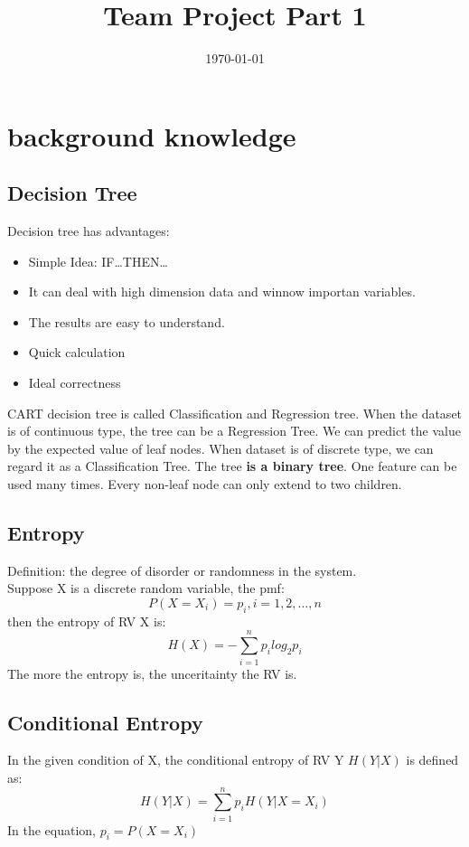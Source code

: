 \documentclass[50pt]{article}
\title{Team Project Part 1}
\date{\today}
\begin{document}
\maketitle

\clearpage
\tableofcontents
\section{background knowledge}
\subsection{Decision Tree}
Decision tree has advantages:
\begin{itemize}
    \item Simple Idea: IF\dots THEN\dots
    \item It can deal with high dimension data and winnow importan variables.
    \item The results are easy to understand.
    \item Quick calculation
    \item Ideal correctness
\end{itemize}
CART decision tree is called Classification and Regression tree. When the dataset is of 
continuous type, the tree can be a Regression Tree. We can predict the value
by the expected value of leaf nodes. When dataset is of discrete type, we can regard it
as a Classification Tree. The tree \textbf{is a binary tree}. One feature can
be used many times. Every non-leaf node can only extend to two children.

\subsection{Entropy}
    Definition: the degree of disorder or randomness in the system.\\
    Suppose X is a discrete random variable, the pmf:
    $$P(X = X_i) = p_i, i = 1, 2, \dots, n$$
    then the entropy of RV X is:
    $$H(X) = -\sum_{i=1}^{n}p_{i}log_{2}{p_i}$$
    The more the entropy is, the unceritainty the RV is.
\subsection{Conditional Entropy}
    In the given condition of X, the conditional entropy of RV Y $H(Y|X)$ is defined as:
    $$H(Y|X) = \sum_{i=1}^{n}p_{i}H(Y|X=X_{i})$$
    In the equation, $p_{i} = P(X=X_{i})$
\end{document}
